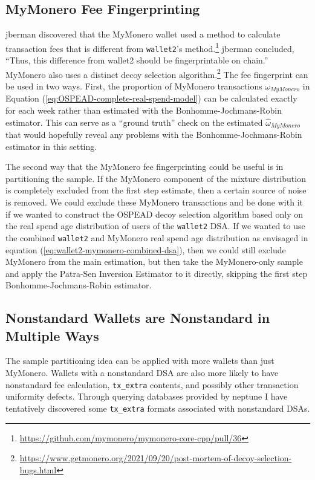 \documentclass[english]{article}
\begin{document}
\subsection{MyMonero Fee Fingerprinting\label{subsec:MyMonero-Fee-Fingerprinting}}

jberman discovered that the MyMonero wallet used a method to calculate
transaction fees that is different from \texttt{wallet2}'s method.\footnote{\href{https://github.com/mymonero/mymonero-core-cpp/pull/36}{https://github.com/mymonero/mymonero-core-cpp/pull/36}}
jberman concluded, ``Thus, this difference from wallet2 should be
fingerprintable on chain.'' MyMonero also uses a distinct decoy selection
algorithm.\footnote{\href{https://www.getmonero.org/2021/09/20/post-mortem-of-decoy-selection-bugs.html}{https://www.getmonero.org/2021/09/20/post-mortem-of-decoy-selection-bugs.html}}
The fee fingerprint can be used in two ways. First, the proportion
of MyMonero transactions $\omega_{MyMonero}$ in Equation (\ref{eq:OSPEAD-complete-real-spend-model})
can be calculated exactly for each week rather than estimated with
the Bonhomme-Jochmans-Robin estimator. This can serve as a ``ground
truth'' check on the estimated $\hat{\omega}_{MyMonero}$ that would
hopefully reveal any problems with the Bonhomme-Jochmans-Robin estimator
in this setting.

The second way that the MyMonero fee fingerprinting could be useful
is in partitioning the sample. If the MyMonero component of the mixture
distribution is completely excluded from the first step estimate,
then a certain source of noise is removed. We could exclude these
MyMonero transactions and be done with it if we wanted to construct
the OSPEAD decoy selection algorithm based only on the real spend
age distribution of users of the \texttt{wallet2} DSA. If we wanted
to use the combined \texttt{wallet2} and MyMonero real spend age distribution
as envisaged in equation (\ref{eq:wallet2-mymonero-combined-dsa}),
then we could still exclude MyMonero from the main estimation, but
then take the MyMonero-only sample and apply the Patra-Sen Inversion
Estimator to it directly, skipping the first step Bonhomme-Jochmans-Robin
estimator.

\subsection{Nonstandard Wallets are Nonstandard in Multiple Ways}

The sample partitioning idea can be applied with more wallets than
just MyMonero. Wallets with a nonstandard DSA are also more likely
to have nonstandard fee calculation, \texttt{tx\_extra} contents,
and possibly other transaction uniformity defects. Through querying
databases provided by neptune I have tentatively discovered some \texttt{tx\_extra}
formats associated with nonstandard DSAs. 
\end{document}
